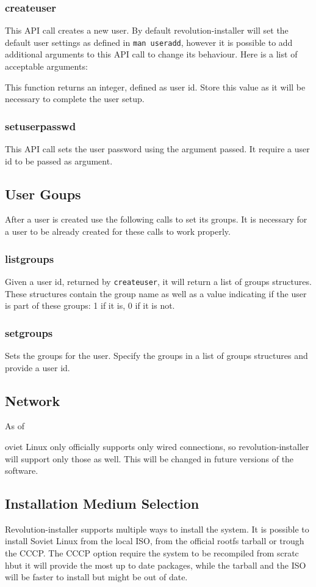 \documentclass{scrartcl}
\begin{document}
\subsubsection{createuser}
This API call creates a new user. By default revolution-installer will set
the default user settings as defined in \texttt{man useradd}, however it
is possible to add additional arguments to this API call to change its behaviour.
Here is a list of acceptable arguments:

This function returns an integer, defined as user id. Store this value as it
will be necessary to complete the user setup.
\subsubsection{setuserpasswd}
This API call sets the user password using the argument passed. It require a
user id to be passed as argument.

\subsection{User Goups}
After a user is created use the following calls to set its groups. It is necessary
for a user to be already created for these calls to work properly.
\subsubsection{listgroups}
Given a user id, returned by \texttt{createuser}, it will return a list of
groups structures. These structures contain the group name as well as a value
indicating if the user is part of these groups: 1 if it is, 0 if it is not.
\subsubsection{setgroups}
Sets the groups for the user. Specify the groups in a list of groups structures
and provide a user id.

\subsection{Network}
As of \date Soviet Linux only officially supports only wired connections, so
revolution-installer will support only those as well. This will be changed in
future versions of the software.

\subsection{Installation Medium Selection}
Revolution-installer supports multiple ways to install the system. It is possible
to install Soviet Linux from the local ISO, from the official rootfs tarball or
trough the CCCP. The CCCP option require the system to  be recompiled from scratc
hbut it will provide the most up to date packages, while the tarball and the ISO
will be faster to install but might be out of date.
\end{document}
